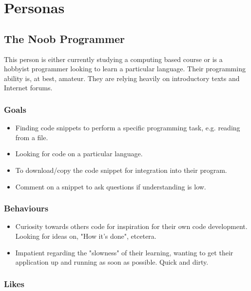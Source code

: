 \documentclass[11pt,a4paper]{article}
\begin{document}
\newpage

\section{Personas}

\subsection{The Noob Programmer}

This person is either currently studying a computing based course or is a
hobbyist programmer looking to learn a particular language. Their programming
ability is, at best, amateur. They are relying heavily on introductory texts
and Internet forums.

\subsubsection{Goals}

\begin{itemize}
\item Finding code snippets to perform a specific programming task,
e.g. reading from a file.
\item Looking for code on a particular language.
\item To download/copy the code snippet for integration into their
program.
\item Comment on a snippet to ask questions if understanding is low.
\end{itemize}

\subsubsection{Behaviours}

\begin{itemize}
\item Curiosity towards others code for inspiration for their own code
development. Looking for ideas on, "How it's done", etcetera.
\item Impatient regarding the "slowness" of their learning, wanting to
get their application up and running as soon as possible. Quick and
dirty.
\end{itemize}

\subsubsection{Likes}
\end{document}
